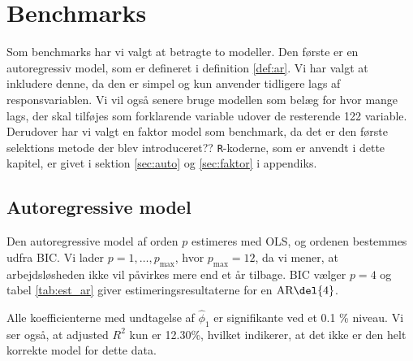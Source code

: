 \chapter{Benchmarks}
Som benchmarks har vi valgt at betragte to modeller. 
Den første er en autoregressiv model, som er defineret i definition \ref{def:ar}.
Vi har valgt at inkludere denne, da den er simpel og kun anvender tidligere lags af responsvariablen. 
Vi vil også senere bruge modellen som belæg for hvor mange lags, der skal tilføjes som forklarende variable udover de resterende 122 variable. 
Derudover har vi valgt en faktor model som benchmark, da det er den første selektions metode der blev introduceret??
\texttt{R}-koderne, som er anvendt i dette kapitel, er givet i sektion \ref{sec:auto} og \ref{sec:faktor} i appendiks.

\section{Autoregressive model}
Den autoregressive model af orden \(p\) estimeres med OLS, og ordenen bestemmes udfra BIC.
Vi lader $p = 1, \ldots, p_{\max}$, hvor \(p_\text{max}=12\), da vi mener, at arbejdsløsheden ikke vil påvirkes mere end et år tilbage.
BIC vælger \(p=4\) og tabel \ref{tab:est_ar} giver estimeringsresultaterne for en \(\text{AR} \del{4}\).
%


Alle koefficienterne med undtagelse af $\widehat\phi_1$ er signifikante ved et 0.1 \% niveau. 
Vi ser også, at adjusted $R^2$ kun er 12.30\%, hvilket indikerer, at det ikke er den helt korrekte model for dette data. 

